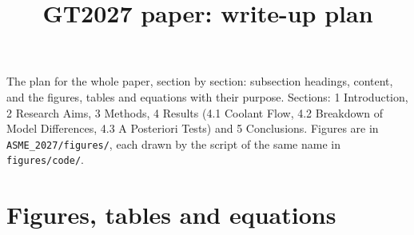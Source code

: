 \documentclass[10pt]{article}
\title{GT2027 paper: write-up plan}
\author{}
\date{}
\begin{document}
\maketitle
\vspace{-14mm}

The plan for the whole paper, section by section: subsection headings, content, and the figures, tables and
equations with their purpose. Sections: 1 Introduction, 2 Research Aims, 3 Methods, 4 Results (4.1 Coolant Flow,
4.2 Breakdown of Model Differences, 4.3 A Posteriori Tests) and 5 Conclusions. Figures are in
\texttt{ASME\_2027/figures/}, each drawn by the script of the same name in \texttt{figures/code/}.

\section*{Figures, tables and equations}
\end{document}
